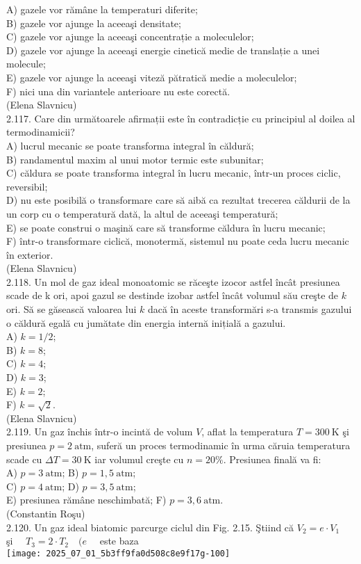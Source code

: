A) gazele vor rămâne la temperaturi diferite;\\
B) gazele vor ajunge la aceeaşi densitate;\\
C) gazele vor ajunge la aceeaşi concentrație a moleculelor;\\
D) gazele vor ajunge la aceeaşi energie cinetică medie de translație a unei molecule;\\
E) gazele vor ajunge la aceeaşi viteză pătratică medie a moleculelor;\\
F) nici una din variantele anterioare nu este corectă.\\
(Elena Slavnicu)\\
2.117. Care din următoarele afirmații este în contradicție cu principiul al doilea al termodinamicii?\\
A) lucrul mecanic se poate transforma integral în căldură;\\
B) randamentul maxim al unui motor termic este subunitar;\\
C) căldura se poate transforma integral în lucru mecanic, într-un proces ciclic, reversibil;\\
D) nu este posibilă o transformare care să aibă ca rezultat trecerea căldurii de la un corp cu o temperatură dată, la altul de aceeaşi temperatură;\\
E) se poate construi o maşină care să transforme căldura în lucru mecanic;\\
F) într-o transformare ciclică, monotermă, sistemul nu poate ceda lucru mecanic în exterior.\\
(Elena Slavnicu)\\
2.118. Un mol de gaz ideal monoatomic se răceşte izocor astfel încât presiunea scade de k ori, apoi gazul se destinde izobar astfel încât volumul său creşte de $k$ ori. Să se găsească valoarea lui $k$ dacă în aceste transformări s-a transmis gazului o căldură egală cu jumătate din energia internă inițială a gazului.\\
A) $k=1 / 2$;\\
B) $k=8$;\\
C) $k=4$;\\
D) $k=3$;\\
E) $k=2$;\\
F) $k=\sqrt{2}$.\\
(Elena Slavnicu)\\
2.119. Un gaz închis într-o incintă de volum $V$, aflat la temperatura $T=300 \mathrm{~K}$ şi presiunea $p=2 \mathrm{~atm}$, suferă un proces termodinamic în urma căruia temperatura scade cu $\Delta T=30 \mathrm{~K}$ iar volumul creşte cu $n=20 \%$. Presiunea finală va fi:\\
A) $p=3 \mathrm{~atm}$; B) $p=1,5 \mathrm{~atm}$;\\
C) $p=4 \mathrm{~atm}$; D) $p=3,5 \mathrm{~atm}$;\\
E) presiunea rămâne neschimbată; F) $p=3,6 \mathrm{~atm}$.\\
(Constantin Roşu)\\
2.120. Un gaz ideal biatomic parcurge ciclul din Fig. 2.15. Ştiind că $V_{2}=e \cdot V_{1} \quad$ şi $\quad T_{3}=2 \cdot T_{2} \quad(e \quad$ este baza\\
\texttt{[image: 2025\_07\_01\_5b3ff9fa0d508c8e9f17g-100]}

